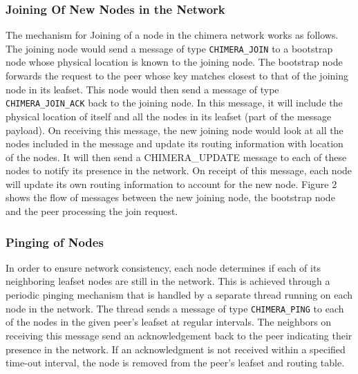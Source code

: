 \subsubsection{Joining Of New Nodes in the Network}
The mechanism for Joining of a node in the chimera network works as follows. The joining node would send a message of type \texttt{CHIMERA\_JOIN} to a bootstrap node whose physical location is known to the joining node. The bootstrap node forwards the request to the peer whose key matches closest to that of the joining node in its leafset. This node would then send a message of type \texttt{CHIMERA\_JOIN\_ACK} back to the joining node. In this message, it will include the physical location of itself and all the nodes in its leafset (part of the message payload). On receiving this message, the new joining node would look at all the nodes included in the message and update its routing information with location of the nodes. It will then send a CHIMERA\_UPDATE message to each of these nodes to notify its presence in the network. On receipt of this message, each node will update its own routing information to account for the new node. Figure 2 shows the flow of messages between the new joining node, the bootstrap node and the peer processing the join request.
 
\subsubsection{Pinging of Nodes}
In order to ensure network consistency, each node determines if each of its neighboring leafset nodes are still in the network. This is achieved through a periodic pinging mechanism that is handled by a separate thread running on each node in the network. The thread sends a message of type \texttt{CHIMERA\_PING} to each of the nodes in the given peer’s leafset at regular intervals. The neighbors on receiving this message send an acknowledgement back to the peer indicating their presence in the network. If an acknowledgment is not received within a specified time-out interval, the node is removed from the peer’s leafset and routing table.

